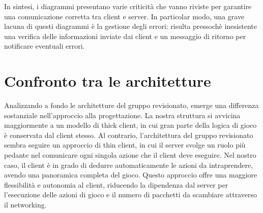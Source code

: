 \documentclass[12pt]{article}
\begin{document}
In sintesi, i diagrammi presentano varie criticità che vanno riviste per garantire una comunicazione corretta tra client e server. In particolar modo, una grave lacuna di questi diagrammi è la gestione degli errori: risulta pressochè inesistente una verifica delle informazioni inviate dai client e un messaggio di ritorno per notificare eventuali errori.
%
\section{Confronto tra le architetture}
%
%
Analizzando a fondo le architetture del gruppo revisionato, emerge una differenza sostanziale nell'approccio alla progettazione. La nostra struttura si avvicina maggiormente a un modello di thick client, in cui gran parte della logica di gioco è conservata dal client stesso. Al contrario, l'architettura del gruppo revisionato sembra seguire un approccio di thin client, in cui il server svolge un ruolo più pedante nel comunicare ogni singola azione che il client deve eseguire. Nel nostro caso, il client è in grado di dedurre automaticamente le azioni da intraprendere, avendo una panoramica completa del gioco. Questo approccio offre una maggiore flessibilità e autonomia al client,
riducendo la dipendenza dal server per l’esecuzione delle azioni di gioco e il numero di pacchetti da scambiare attraverso il networking.
\end{document}

